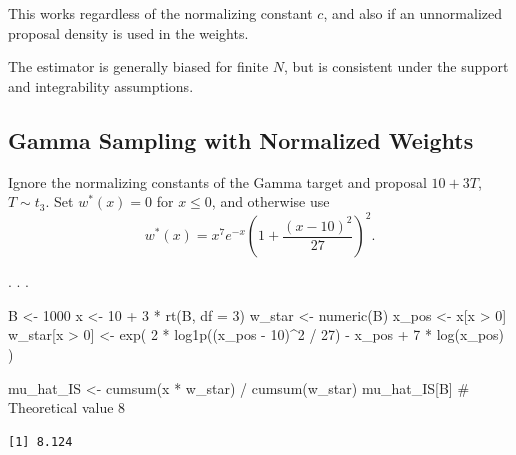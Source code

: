 \documentclass[
  letterpaper,
  DIV=11,
  numbers=noendperiod]{scrartcl}
\newenvironment{Shaded}{\begin{snugshade}}{\end{snugshade}}
\newcommand{\AttributeTok}[1]{\textcolor[rgb]{0.40,0.45,0.13}{#1}}
\newcommand{\CommentTok}[1]{\textcolor[rgb]{0.37,0.37,0.37}{#1}}
\newcommand{\DecValTok}[1]{\textcolor[rgb]{0.68,0.00,0.00}{#1}}
\newcommand{\FunctionTok}[1]{\textcolor[rgb]{0.28,0.35,0.67}{#1}}
\newcommand{\NormalTok}[1]{\textcolor[rgb]{0.00,0.23,0.31}{#1}}
\newcommand{\OtherTok}[1]{\textcolor[rgb]{0.00,0.23,0.31}{#1}}
\newcommand{\SpecialCharTok}[1]{\textcolor[rgb]{0.37,0.37,0.37}{#1}}
\begin{document}
\medskip\pause

This works regardless of the normalizing constant \(c\), and also if an
unnormalized proposal density is used in the weights.

\medskip\pause

The estimator is generally biased for finite \(N\), but is consistent
under the support and integrability assumptions.

\subsection{Gamma Sampling with Normalized
Weights}\label{gamma-sampling-with-normalized-weights}

Ignore the normalizing constants of the Gamma target and proposal
\(10 + 3T\), \(T \sim t_3\). Set \(w^*(x) = 0\) for \(x \leq 0\), and
otherwise use \[
  w^*(x) = x^7 e^{-x} \left( 1 + \frac{(x - 10)^2}{27} \right)^2.
\]

. . .

\begin{Shaded}
\begin{Highlighting}[]
\NormalTok{B }\OtherTok{\textless{}{-}} \DecValTok{1000}
\NormalTok{x }\OtherTok{\textless{}{-}} \DecValTok{10} \SpecialCharTok{+} \DecValTok{3} \SpecialCharTok{*} \FunctionTok{rt}\NormalTok{(B, }\AttributeTok{df =} \DecValTok{3}\NormalTok{)}
\NormalTok{w\_star }\OtherTok{\textless{}{-}} \FunctionTok{numeric}\NormalTok{(B)}
\NormalTok{x\_pos }\OtherTok{\textless{}{-}}\NormalTok{ x[x }\SpecialCharTok{\textgreater{}} \DecValTok{0}\NormalTok{]}
\NormalTok{w\_star[x }\SpecialCharTok{\textgreater{}} \DecValTok{0}\NormalTok{] }\OtherTok{\textless{}{-}} \FunctionTok{exp}\NormalTok{(}
  \DecValTok{2} \SpecialCharTok{*} \FunctionTok{log1p}\NormalTok{((x\_pos }\SpecialCharTok{{-}} \DecValTok{10}\NormalTok{)}\SpecialCharTok{\^{}}\DecValTok{2} \SpecialCharTok{/} \DecValTok{27}\NormalTok{) }\SpecialCharTok{{-}}\NormalTok{ x\_pos }\SpecialCharTok{+} \DecValTok{7} \SpecialCharTok{*} \FunctionTok{log}\NormalTok{(x\_pos)}
\NormalTok{)}

\NormalTok{mu\_hat\_IS }\OtherTok{\textless{}{-}} \FunctionTok{cumsum}\NormalTok{(x }\SpecialCharTok{*}\NormalTok{ w\_star) }\SpecialCharTok{/} \FunctionTok{cumsum}\NormalTok{(w\_star)}
\NormalTok{mu\_hat\_IS[B] }\CommentTok{\# Theoretical value 8}
\end{Highlighting}
\end{Shaded}

\begin{verbatim}
[1] 8.124
\end{verbatim}
\end{document}
